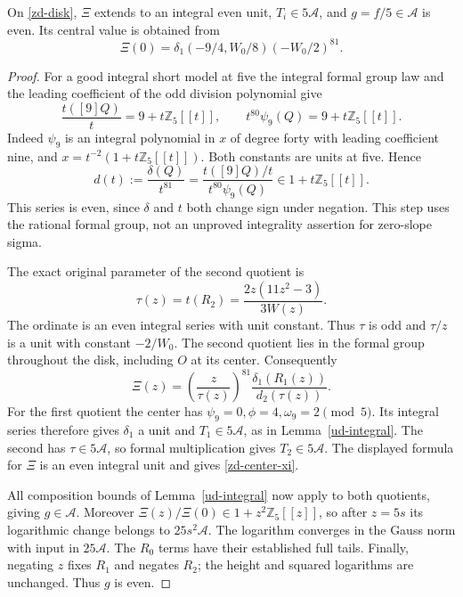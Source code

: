 \begin{lemma}
\label{zd-removable}
On \eqref{zd-disk}, \(\Xi\) extends to an integral even unit,
\(T_i\in5\mathcal A\), and \(g=f/5\in\mathcal A\) is even.
Its central value is obtained from
\begin{equation}
 \Xi(0)=\delta_1(-9/4,W_0/8)(-W_0/2)^{81}.
 \label{zd-center-xi}
\end{equation}
\end{lemma}
\begin{proof}
For a good integral short model at five the integral formal group
law and the leading coefficient of the odd division polynomial give
\[
 \frac{t([9]Q)}t=9+t\mathbb Z_5[[t]],\qquad
 t^{80}\psi_9(Q)=9+t\mathbb Z_5[[t]].
\]
Indeed \(\psi_9\) is an integral polynomial in \(x\) of degree
forty with leading coefficient nine, and
\(x=t^{-2}(1+t\mathbb Z_5[[t]])\).
Both constants are units at five. Hence
\begin{equation}
 d(t):=\frac{\delta(Q)}{t^{81}}
   =\frac{t([9]Q)/t}{t^{80}\psi_9(Q)}
       \in1+t\mathbb Z_5[[t]].
 \label{zd-formal-ratio}
\end{equation}
This series is even, since \(\delta\) and \(t\) both change sign
under negation. This step uses the rational formal group, not an
unproved integrality assertion for zero-slope sigma.

The exact original parameter of the second quotient is
\[
 \tau(z)=t(R_2)=\frac{2z(11z^2-3)}{3W(z)}.
\]
The ordinate is an even integral series with unit constant.
Thus \(\tau\) is odd and \(\tau/z\) is a unit with constant
\(-2/W_0\). The second quotient lies in the formal group throughout
the disk, including \(O\) at its center. Consequently
\[
 \Xi(z)=\left(\frac z{\tau(z)}\right)^{81}
          \frac{\delta_1(R_1(z))}{d_2(\tau(z))}.
\]
For the first quotient the center has
\(\psi_9=0,\phi=4,\omega_9=2\pmod5\). Its integral series
therefore gives \(\delta_1\) a unit and \(T_1\in5\mathcal A\),
as in Lemma~\ref{ud-integral}. The second has
\(\tau\in5\mathcal A\), so formal multiplication gives
\(T_2\in5\mathcal A\). The displayed formula for \(\Xi\) is an
even integral unit and gives \eqref{zd-center-xi}.

All composition bounds of Lemma~\ref{ud-integral} now apply to both
quotients, giving \(g\in\mathcal A\). Moreover
\(\Xi(z)/\Xi(0)\in1+z^2\mathbb Z_5[[z]]\), so after \(z=5s\)
its logarithmic change belongs to \(25s^2\mathcal A\).
The logarithm converges in the Gauss norm with input in
\(25\mathcal A\). The \(R_0\) terms have their established full
tails. Finally, negating \(z\) fixes \(R_1\) and negates \(R_2\);
the height and squared logarithms are unchanged. Thus \(g\) is even.
\end{proof}

